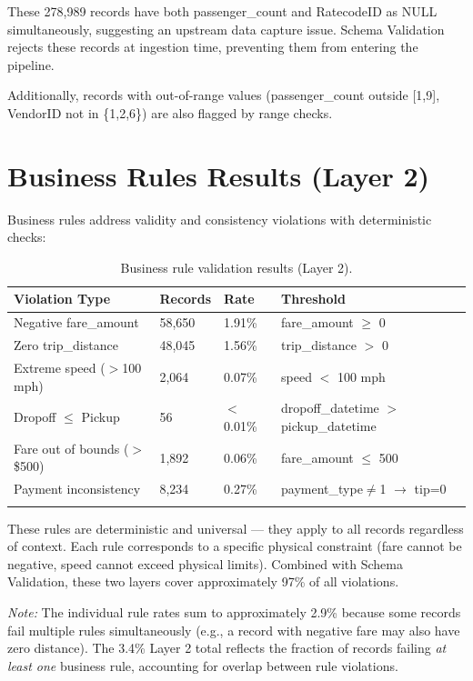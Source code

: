 These 278,989 records have both passenger\_count and RatecodeID as NULL simultaneously, suggesting an upstream data capture issue. Schema Validation rejects these records at ingestion time, preventing them from entering the pipeline.

Additionally, records with out-of-range values (passenger\_count outside [1,9], VendorID not in \{1,2,6\}) are also flagged by range checks.

\section{Business Rules Results (Layer 2)}

Business rules address validity and consistency violations with deterministic checks:

\begin{longtable}{|m{4.5cm}|R{2.5cm}|R{2cm}|m{3.5cm}|}
\hline
\textbf{Violation Type} & \textbf{Records} & \textbf{Rate} & \textbf{Threshold} \\ \hline
Negative fare\_amount & 58,650 & 1.91\% & fare\_amount $\geq$ 0 \\ \hline
Zero trip\_distance & 48,045 & 1.56\% & trip\_distance $>$ 0 \\ \hline
Extreme speed ($>$100 mph) & 2,064 & 0.07\% & speed $<$ 100 mph \\ \hline
Dropoff $\leq$ Pickup & 56 & $<$0.01\% & dropoff\_datetime $>$ pickup\_datetime \\ \hline
Fare out of bounds ($>$\$500) & 1,892 & 0.06\% & fare\_amount $\leq$ 500 \\ \hline
Payment inconsistency & 8,234 & 0.27\% & payment\_type$\neq$1 $\to$ tip=0 \\ \hline
\caption{Business rule validation results (Layer 2).}
\label{tab:business_rules_results}
\end{longtable}

These rules are deterministic and universal --- they apply to all records regardless of context. Each rule corresponds to a specific physical constraint (fare cannot be negative, speed cannot exceed physical limits). Combined with Schema Validation, these two layers cover approximately 97\% of all violations.

\textit{Note:} The individual rule rates sum to approximately 2.9\% because some records fail multiple rules simultaneously (e.g., a record with negative fare may also have zero distance). The 3.4\% Layer 2 total reflects the fraction of records failing \textit{at least one} business rule, accounting for overlap between rule violations.

